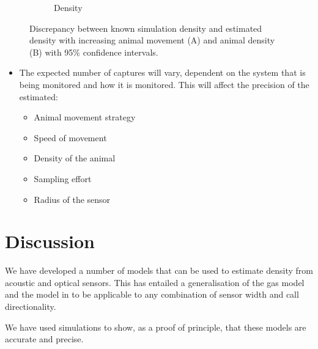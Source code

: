 \documentclass[a4paper,10pt,reqno,oneside]{amsart}
\begin{document}
\begin{figure}[t]
\begin{subfigure}[t]{0.5\textwidth}
                \caption{Density}
                \label{f:Density}
        \end{subfigure}
	\caption{Discrepancy between known simulation density and estimated density with increasing animal movement (A) and animal density (B) with 95\% confidence intervals.}
	\label{}
\end{figure}

\begin{itemize}
\item The expected number of captures will vary, dependent on the system that is being monitored and how it is monitored. This will affect the precision of the estimated: 
	\begin{itemize}
	\item Animal movement strategy
	\item Speed of movement
	\item Density of the animal
	\item Sampling effort
	\item Radius of the sensor
	\end{itemize}
\end{itemize}


\section{Discussion}


We have developed a number of models that can be used to estimate density from acoustic and optical sensors. This has entailed a generalisation of the gas model and the model in \cite{rowcliffe2008estimating} to be applicable to any combination of sensor width and call directionality. 

We have used simulations to show, as a proof of principle, that these models are accurate and precise. %
\end{document}
